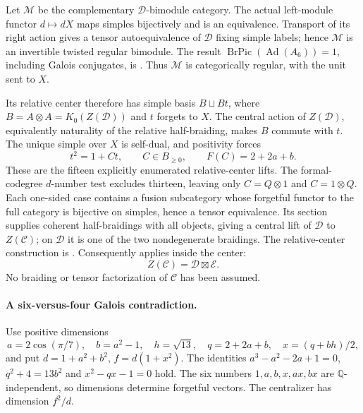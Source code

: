 Let $\mathcal M$ be the complementary $\mathcal D$-bimodule category.
The actual left-module functor $d\mapsto dX$ maps simples bijectively
and is an equivalence. Transport of its right action gives a tensor
autoequivalence of $\mathcal D$ fixing simple labels; hence
$\mathcal M$ is an invertible twisted regular bimodule.
The result $\operatorname{BrPic}(\operatorname{Ad}(A_6))=1$,
including Galois conjugates, is \cite[Theorem~1.2]{EMADE}.
Thus $\mathcal M$ is categorically regular, with the unit sent to $X$.

Its relative center therefore has simple basis $B\sqcup Bt$, where
$B=A\otimes A=K_0(Z(\mathcal D))$ and $t$ forgets to $X$.
The central action of $Z(\mathcal D)$, equivalently naturality of the
relative half-braiding, makes $B$ commute with $t$.
The unique simple over $X$ is self-dual, and positivity forces
\[
 t^2=1+Ct,\qquad C\in B_{\ge0},\qquad F(C)=2+2a+b.
\]
These are the fifteen explicitly enumerated relative-center lifts.
The formal-codegree $d$-number test excludes thirteen, leaving only
$C=Q\otimes1$ and $C=1\otimes Q$.
Each one-sided case contains a fusion subcategory whose forgetful
functor to the full category is bijective on simples, hence a tensor
equivalence. Its section supplies coherent half-braidings with all
objects, giving a central lift of $\mathcal D$ to $Z(\mathcal C)$;
on $\mathcal D$ it is one of the two nondegenerate braidings.
The relative-center construction is \cite[Section~2.2]{GNNrel}.
Consequently \cite[Theorem~3.13]{DGNO} applies inside the center:
\[
 Z(\mathcal C)=\mathcal D\boxtimes\mathcal E.
\]
No braiding or tensor factorization of $\mathcal C$ has been assumed.

\paragraph{A six-versus-four Galois contradiction.}
Use positive dimensions
\[
 a=2\cos(\pi/7),\quad b=a^2-1,\quad h=\sqrt{13},\quad
 q=2+2a+b,\quad x=(q+bh)/2,
\]
and put $d=1+a^2+b^2$, $f=d(1+x^2)$.
The identities $a^3-a^2-2a+1=0$, $q^2+4=13b^2$ and
$x^2-qx-1=0$ hold. The six numbers $1,a,b,x,ax,bx$ are
$\mathbb Q$-independent, so dimensions determine forgetful vectors.
The centralizer has dimension $f^2/d$.

